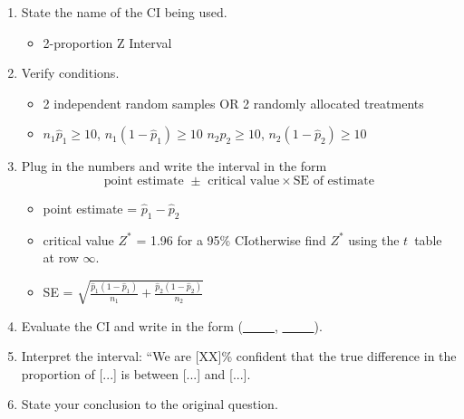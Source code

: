 \begin{termBox}{
\begin{enumerate}
\setlength{\itemsep}{0mm}
\item State the name of the CI being used.
\begin{itemize}
\item 2-proportion Z Interval
\end{itemize}
\item Verify conditions.
\begin{itemize}
\item 2 independent random samples OR 2 randomly allocated treatments
\item $n_1\hat{p}_1\geq10$, $n_1(1-\hat{p}_1)\geq10$  \newline $n_2\hat{p}_2\geq10$, $n_2(1-\hat{p}_2)\geq10$
\end{itemize}
\item Plug in the numbers and write the interval in the form
$$\text{point estimate } \pm \text{ critical value}\times \text{SE of estimate}$$
\begin{itemize}
\item point estimate = $\hat{p}_1-\hat{p}_2$
\item critical value $Z^*$ = 1.96 for a 95\% CI\newline otherwise find $Z^*$ using the $t$~table at row $\infty$.
\item SE = $\sqrt{\frac{\hat{p}_1(1-\hat{p}_1)}{n_1} + \frac{\hat{p}_2(1-\hat{p}_2)}{n_2}}$
\end{itemize}
\item Evaluate the CI and write in the form (\underline{\ \ \ \ \ }, \underline{\ \ \ \ \ }).
\item Interpret the interval: ``We are [XX]\% confident that the true difference in the proportion of [...] is between [...] and [...].
\item State your conclusion to the original question.
\end{enumerate}}
\end{termBox}


